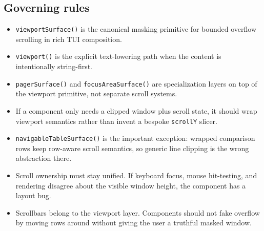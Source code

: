 \subsection{Governing rules}\label{record-023-governing-rules}

\begin{itemize}
\tightlist
\item
  \texttt{v\allowbreak{}i\allowbreak{}e\allowbreak{}w\allowbreak{}p\allowbreak{}o\allowbreak{}r\allowbreak{}t\allowbreak{}S\allowbreak{}u\allowbreak{}r\allowbreak{}f\allowbreak{}a\allowbreak{}c\allowbreak{}e\allowbreak{}(\allowbreak{})} is the canonical masking primitive for bounded overflow scrolling in rich TUI composition.
\item
  \texttt{v\allowbreak{}i\allowbreak{}e\allowbreak{}w\allowbreak{}p\allowbreak{}o\allowbreak{}r\allowbreak{}t\allowbreak{}(\allowbreak{})} is the explicit text-lowering path when the content is intentionally string-first.
\item
  \texttt{p\allowbreak{}a\allowbreak{}g\allowbreak{}e\allowbreak{}r\allowbreak{}S\allowbreak{}u\allowbreak{}r\allowbreak{}f\allowbreak{}a\allowbreak{}c\allowbreak{}e\allowbreak{}(\allowbreak{})} and \texttt{f\allowbreak{}o\allowbreak{}c\allowbreak{}u\allowbreak{}s\allowbreak{}A\allowbreak{}r\allowbreak{}e\allowbreak{}a\allowbreak{}S\allowbreak{}u\allowbreak{}r\allowbreak{}f\allowbreak{}a\allowbreak{}c\allowbreak{}e\allowbreak{}(\allowbreak{})} are specialization layers on top of the viewport primitive, not separate scroll systems.
\item
  If a component only needs a clipped window plus scroll state, it should wrap viewport semantics rather than invent a bespoke \texttt{s\allowbreak{}c\allowbreak{}r\allowbreak{}o\allowbreak{}l\allowbreak{}l\allowbreak{}Y} slicer.
\item
  \texttt{n\allowbreak{}a\allowbreak{}v\allowbreak{}i\allowbreak{}g\allowbreak{}a\allowbreak{}b\allowbreak{}l\allowbreak{}e\allowbreak{}T\allowbreak{}a\allowbreak{}b\allowbreak{}l\allowbreak{}e\allowbreak{}S\allowbreak{}u\allowbreak{}r\allowbreak{}f\allowbreak{}a\allowbreak{}c\allowbreak{}e\allowbreak{}(\allowbreak{})} is the important exception: wrapped comparison rows keep row-aware scroll semantics, so generic line clipping is the wrong abstraction there.
\item
  Scroll ownership must stay unified. If keyboard focus, mouse hit-testing, and rendering disagree about the visible window height, the component has a layout bug.
\item
  Scrollbars belong to the viewport layer. Components should not fake overflow by moving rows around without giving the user a truthful masked window.
\end{itemize}

